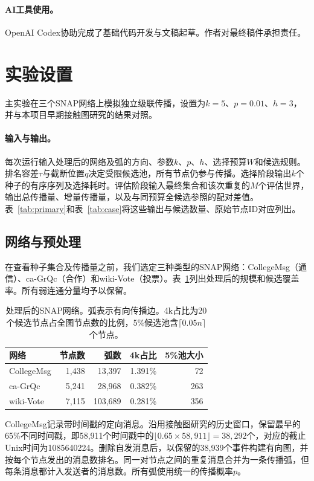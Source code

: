 \documentclass[smallextended]{svjour3}
\begin{document}
\paragraph{AI工具使用。}OpenAI Codex协助完成了基础代码开发与文稿起草。作者对最终稿件承担责任。

\section{实验设置}\label{sec:experimental-setup}
主实验在三个SNAP网络上模拟独立级联传播，设置为$k=5$、$p=0.01$、$h=3$，并与本项目早期接触图研究的结果对照。

\paragraph{输入与输出。}每次运行输入处理后的网络及弧的方向、参数$k$、$p$、$h$、选择预算$W$和候选规则。排名容差$\tau$与截断位置$q$决定受限候选池，所有节点仍参与传播。选择阶段输出$k$个种子的有序序列及选择耗时。评估阶段输入最终集合和该次重复的$M$个评估世界，输出总传播量、增量传播量，以及与同预算全候选参照的配对差值。表~\ref{tab:primary}和表~\ref{tab:case}将这些输出与候选数量、原始节点ID对应列出。

\subsection{网络与预处理}
在查看种子集合及传播量之前，我们选定三种类型的SNAP网络\cite{snap}：CollegeMsg（通信）、ca-GrQc（合作）和wiki-Vote（投票）。表~\ref{tab:data}列出处理后的规模和候选覆盖率。所有弱连通分量均予以保留。
\begin{table}[htbp]
\caption{处理后的SNAP网络。弧表示有向传播边。4k占比为20个候选节点占全图节点数的比例，5\%候选池含$\lceil0.05n\rceil$个节点。}\label{tab:data}
\begin{tabular}{lrrrr}
\toprule
网络 & 节点数 & 弧数 & 4k占比 & 5\%池大小 \\
\midrule
CollegeMsg & 1,438 & 13,397 & 1.391\% & 72 \\
ca-GrQc & 5,241 & 28,968 & 0.382\% & 263 \\
wiki-Vote & 7,115 & 103,689 & 0.281\% & 356 \\
\bottomrule
\end{tabular}
\end{table}

CollegeMsg记录带时间戳的定向消息\cite{college}。沿用接触图研究的历史窗口，保留最早的65\%不同时间戳，即58,911个时间戳中的$\lfloor0.65\times58{,}911\rfloor=38{,}292$个，对应的截止Unix时间为1085640224。删除自发消息后，以保留的38,939个事件构建有向图，并按每个节点发出的消息数排名。同一对节点之间的重复消息合并为一条传播弧，但每条消息都计入发送者的消息数。所有弧使用统一的传播概率$p$。
\end{document}
